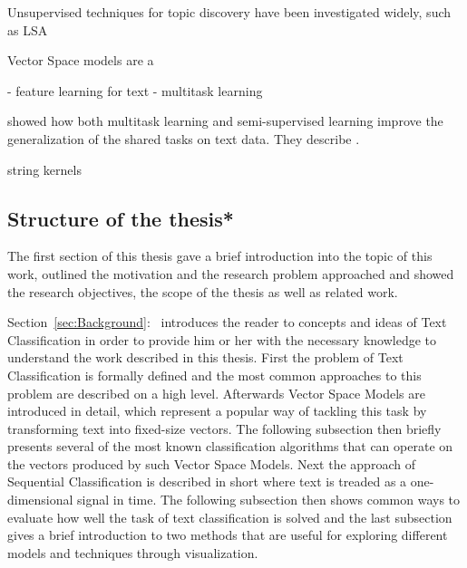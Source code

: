 Unsupervised techniques for topic discovery have been investigated widely, such as LSA

Vector Space models are a

- feature learning for text
- multitask learning


\cite{Collobert:2008aa} showed how both multitask learning and semi-supervised learning improve the generalization of the shared tasks on text data. They describe .

\cite{Lodhi:2002aa} string kernels


\subsection{Structure of the thesis*}

The first section of this thesis gave a brief introduction into the topic of this work, outlined the motivation and the research problem approached and showed the research objectives, the scope of the thesis as well as related work.

Section~\ref{sec:Background}:~ introduces the reader to concepts and ideas of Text Classification in order to provide him or her with the necessary knowledge to understand the work described in this thesis. First the problem of Text Classification is formally defined and the most common approaches to this problem are described on a high level. Afterwards Vector Space Models are introduced in detail, which represent a popular way of tackling this task by transforming text into fixed-size vectors.
The following subsection then briefly presents several of the most known classification algorithms that can operate on the vectors produced by such Vector Space Models. Next the approach of Sequential Classification is described in short where text is treaded as a one-dimensional signal in time. The following subsection then shows common ways to evaluate how well the task of text classification is solved and the last subsection gives a brief introduction to two methods that are useful for exploring different models and techniques through visualization.

